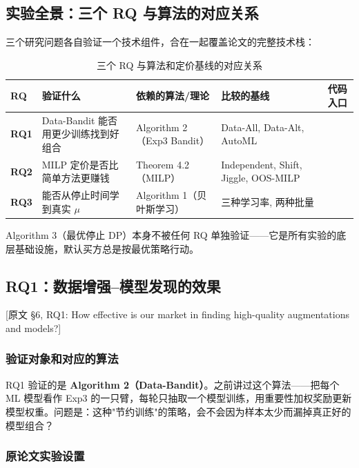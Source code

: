 \documentclass[12pt,a4paper]{article}
\newcommand{\secref}[1]{\hspace{0.6em} \textcolor{black!80}{\footnotesize [原文 #1]}}
\theoremstyle{definition}
\begin{document}
\subsection{实验全景：三个 RQ 与算法的对应关系}

三个研究问题各自验证一个技术组件，合在一起覆盖论文的完整技术栈：

\begin{table}[h]
\centering
\small
\caption{三个 RQ 与算法和定价基线的对应关系}
\begin{tabularx}{\textwidth}{@{}lYYYY@{}}
\toprule
RQ & 验证什么 & 依赖的算法/理论 & 比较的基线 & 代码入口 \\
\midrule
\textbf{RQ1} & Data-Bandit 能否用更少训练找到好组合 & Algorithm 2（Exp3 Bandit） & Data-All, Data-Alt, AutoML &  \\
\textbf{RQ2} & MILP 定价是否比简单方法更赚钱 & Theorem 4.2（MILP） & Independent, Shift, Jiggle, OOS-MILP &  \\
\textbf{RQ3} & 能否从停止时间学到真实 $\mu$ & Algorithm 1（贝叶斯学习） & 三种学习率, 两种批量 &  \\
\bottomrule
\end{tabularx}
\end{table}

Algorithm 3（最优停止 DP）本身不被任何 RQ 单独验证——它是所有实验的底层基础设施，默认买方总是按最优策略行动。

\subsection{RQ1：数据增强--模型发现的效果}
\secref{§6, RQ1: How effective is our market in finding high-quality augmentations and models?}

\subsubsection{验证对象和对应的算法}

RQ1 验证的是 \textbf{Algorithm 2（Data-Bandit）}。之前讲过这个算法——把每个 ML 模型看作 Exp3 的一只臂，每轮只抽取一个模型训练，用重要性加权奖励更新模型权重。问题是：这种"节约训练"的策略，会不会因为样本太少而漏掉真正好的模型组合？

\subsubsection{原论文实验设置}
\end{document}
